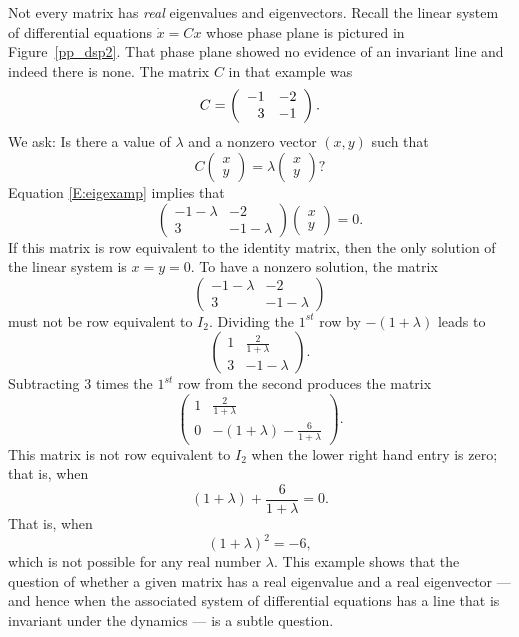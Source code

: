 \documentclass{ximera}
\begin{document}
Not every matrix has {\em real\/} eigenvalues and
eigenvectors.  Recall the linear system of differential 
equations $\dot{x}=Cx$ whose phase plane is pictured in Figure~\ref{pp_dsp2}.  
That phase plane showed no evidence of an invariant line and indeed there is 
none.  The matrix $C$ in that example was
\[
C=\left(\begin{array}{rr} -1 & -2\\ 3 &-1\end{array}\right).
\]
We ask: Is there a value of $\lambda$ and a nonzero vector
$(x,y)$ such that
\begin{equation}  \label{E:eigexamp}
C\left(\begin{array}{c} x\\y\end{array}\right) =
\lambda  \left(\begin{array}{c} x\\y\end{array}\right)?
\end{equation}
Equation \eqref{E:eigexamp} implies that
\[
\left(\begin{array}{cc} -1-\lambda & -2 \\ 3 & -1-\lambda
\end{array}\right) \left(\begin{array}{c}
x\\y\end{array}\right) =0.
\]
If this matrix is row equivalent to the identity matrix, then
the only solution of the linear system is $x=y=0$.  To have a
nonzero solution, the matrix
\[
\left(\begin{array}{cc} -1-\lambda & -2 \\ 3 & -1-\lambda
\end{array}\right)
\]
must not be row equivalent to $I_2$.  Dividing the $1^{st}$ row by
$-(1+\lambda)$ leads to
\[
\left(\begin{array}{cc} 1 & \frac{2}{1+\lambda} \\ 3 & -1-\lambda
\end{array}\right).
\]
Subtracting $3$ times the $1^{st}$ row from the second produces
the matrix
\[
\left(\begin{array}{cc} 1 & \frac{2}{1+\lambda} \\ 0 &
-(1+\lambda) - \frac{6}{1+\lambda}
\end{array}\right).
\]
This matrix is not row equivalent to $I_2$ when the lower
right hand entry is zero; that is, when
\[
(1+\lambda) +\frac{6}{1+\lambda} = 0.
\]
That is, when
\[
(1+\lambda)^2 = -6,
\]
which is not possible for any real number $\lambda$.  This
example shows that the question of whether a given matrix has a
real eigenvalue and a real eigenvector --- and hence when the
associated system of differential equations has a line that is
invariant under the dynamics --- is a subtle question.
\end{document}
